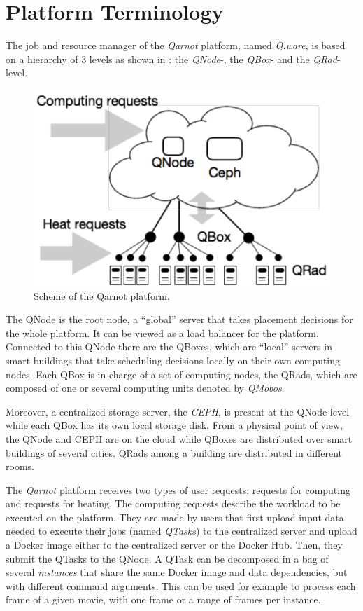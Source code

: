 \section{Platform Terminology}

The job and resource manager of the \emph{Qarnot} platform, named \emph{Q.ware}, is based on a hierarchy of 3 levels as shown in : the \emph{QNode}-, the \emph{QBox}- and the \emph{QRad}-level.

\begin{figure} %
    \centering
    \includegraphics[width=.6\linewidth]{images/qarnot-schema.pdf}
    \caption{Scheme of the Qarnot platform.}
    \label{fig:qarnot-platform}
\end{figure}

The QNode is the root node, a ``global'' server that takes placement decisions for the whole platform. It can be viewed as a load balancer for the platform.
Connected to this QNode there are the QBoxes, which are ``local'' servers in smart buildings that take scheduling decisions locally on their own computing nodes.
Each QBox is in charge of a set of computing nodes, the QRads, which are composed of one or several computing units denoted by \emph{QMobos}.

Moreover, a centralized storage server, the \emph{CEPH}, is present at the QNode-level while each QBox has its own local storage disk. From a physical point of view, the QNode and CEPH are on the cloud while QBoxes are distributed over smart buildings of several cities. QRads among a building are distributed in different rooms.

The \emph{Qarnot} platform receives two types of user requests: requests for computing and requests for heating.
The computing requests describe the workload to be executed on the platform.
They are made by users that first upload input data needed to execute their jobs (named \emph{QTasks}) to the centralized server and upload a Docker image either to the centralized server or the Docker Hub. Then, they submit the QTasks to the QNode.
A QTask can be decomposed in a bag of several \emph{instances} that share the same Docker image and data dependencies, but with different command arguments.
This can be used for example to process each frame of a given movie, with one frame or a range of frames per instance.

